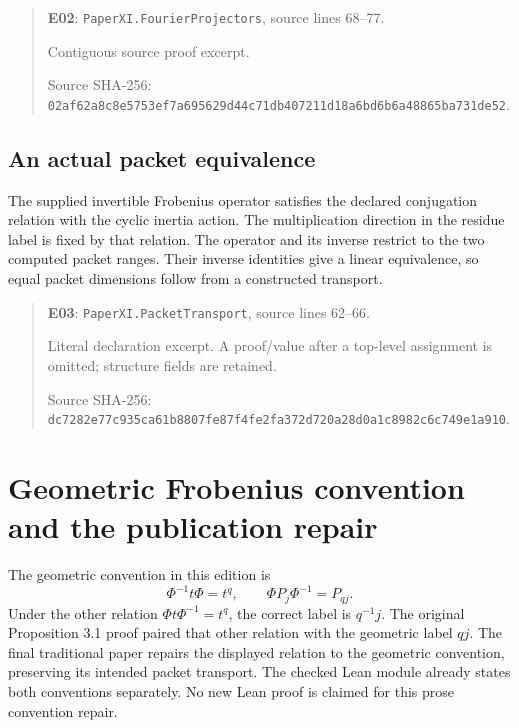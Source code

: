 \documentclass[10pt,oneside]{book}
\begin{document}
\begin{quote}\footnotesize\textbf{E02}: \nolinkurl{PaperXI.FourierProjectors}, source lines 68--77.\par Contiguous source proof excerpt.\par Source SHA-256: {\scriptsize\texttt{02af62a8c8e5753ef7a695629d44c71db407211d18a6bd6b6a48865ba731de52}}.\end{quote}


\subsection{An actual packet equivalence}
\label{guide:E03}
The supplied invertible Frobenius operator satisfies the declared conjugation relation with the cyclic inertia action. The multiplication direction in the residue label is fixed by that relation.
The operator and its inverse restrict to the two computed packet ranges. Their inverse identities give a linear equivalence, so equal packet dimensions follow from a constructed transport.

\begin{quote}\footnotesize\textbf{E03}: \nolinkurl{PaperXI.PacketTransport}, source lines 62--66.\par Literal declaration excerpt. A proof/value after a top-level assignment is omitted; structure fields are retained.\par Source SHA-256: {\scriptsize\texttt{dc7282e77c935ca61b8807fe87f4fe2fa372d720a28d0a1c8982c6c749e1a910}}.\end{quote}


\section{Geometric Frobenius convention and the publication repair}
The geometric convention in this edition is
\[
 \Phi^{-1}t\Phi=t^q,
 \qquad \Phi P_j\Phi^{-1}=P_{qj}.
\]
Under the other relation \(\Phi t\Phi^{-1}=t^q\), the correct label is \(q^{-1}j\). The original Proposition 3.1 proof paired that other relation with the geometric label \(qj\). The final traditional paper repairs the displayed relation to the geometric convention, preserving its intended packet transport. The checked Lean module already states both conventions separately. No new Lean proof is claimed for this prose convention repair.
\end{document}
